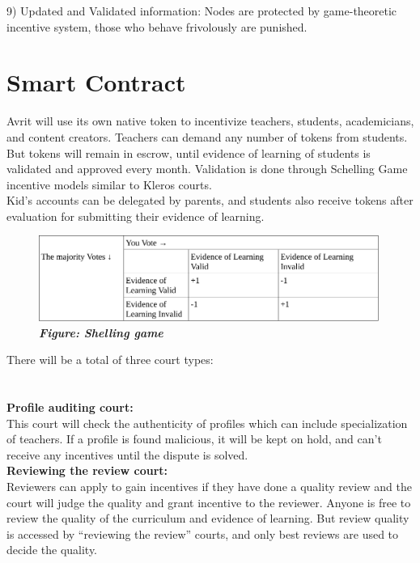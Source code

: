\documentclass[a4paper,12pt,twoside]{extarticle}
\begin{document}
\begin{adjustwidth}{11em}{}
9) Updated and Validated information: Nodes are protected by game-theoretic incentive system, those who behave frivolously are punished.
\section*{Smart Contract}

Avrit will use its own native token to incentivize teachers, students, academicians, and content creators. Teachers can demand any number of tokens from students. But tokens will remain in escrow, until evidence of learning of students is validated and approved every month. Validation is done through Schelling Game incentive models similar to Kleros courts. \\ 
Kid's accounts can be delegated by parents, and students also receive tokens after evaluation for submitting their evidence of learning. 

\begin{figure}[h]\begin{adjustwidth}{11em}{}\includegraphics[width=30em]{shelling_game_avrit.pdf}\begin{mdframed}[style=captionstyle]\caption*{  \scriptsize \textit{\textbf{Figure: Shelling game }}}\end{mdframed}\end{adjustwidth}\end{figure}


There will be a total of three court types: \\
 \\  \\ 
\textbf{Profile auditing court:}  \\
This court will check the authenticity of profiles which can include specialization of teachers. If a profile is found malicious, it will be kept on hold, and can't receive any incentives until the dispute is solved. 
\\  \textbf{Reviewing the review court:} \\
Reviewers can apply to gain incentives if they have done a quality review and the court will judge the quality and grant incentive to the reviewer. Anyone is free to review the quality of the curriculum and evidence of learning. But review quality is accessed by “reviewing the review” courts, and only best reviews are used to decide the quality. 




\end{adjustwidth}
\end{document}
